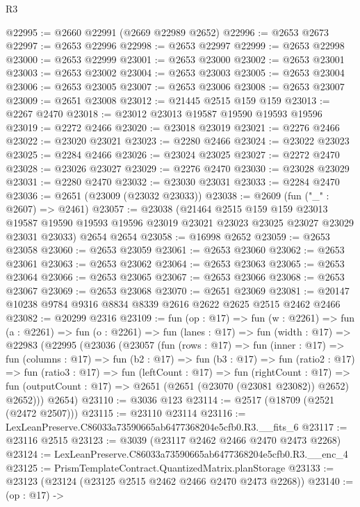 \begin{lexlean}{R3}
\begin{coremodule}
@22995 := @2660 @22991 (@2669 @22989 @2652)
@22996 := @2653 @2673
@22997 := @2653 @22996
@22998 := @2653 @22997
@22999 := @2653 @22998
@23000 := @2653 @22999
@23001 := @2653 @23000
@23002 := @2653 @23001
@23003 := @2653 @23002
@23004 := @2653 @23003
@23005 := @2653 @23004
@23006 := @2653 @23005
@23007 := @2653 @23006
@23008 := @2653 @23007
@23009 := @2651 @23008
@23012 := @21445 @2515 @159 @159
@23013 := @2267 @2470
@23018 := @23012 @23013 @19587 @19590 @19593 @19596
@23019 := @2272 @2466
@23020 := @23018 @23019
@23021 := @2276 @2466
@23022 := @23020 @23021
@23023 := @2280 @2466
@23024 := @23022 @23023
@23025 := @2284 @2466
@23026 := @23024 @23025
@23027 := @2272 @2470
@23028 := @23026 @23027
@23029 := @2276 @2470
@23030 := @23028 @23029
@23031 := @2280 @2470
@23032 := @23030 @23031
@23033 := @2284 @2470
@23036 := @2651 (@23009 (@23032 @23033))
@23038 := @2609 (fun ("_" : @2607) => @2461)
@23057 := @23038
    (@21464
      @2515
      @159
      @159
      @23013
      @19587
      @19590
      @19593
      @19596
      @23019
      @23021
      @23023
      @23025
      @23027
      @23029
      @23031
      @23033)
    @2654
    @2654
@23058 := @16998 @2652
@23059 := @2653 @23058
@23060 := @2653 @23059
@23061 := @2653 @23060
@23062 := @2653 @23061
@23063 := @2653 @23062
@23064 := @2653 @23063
@23065 := @2653 @23064
@23066 := @2653 @23065
@23067 := @2653 @23066
@23068 := @2653 @23067
@23069 := @2653 @23068
@23070 := @2651 @23069
@23081 := @20147 @10238 @9784 @9316 @8834 @8339 @2616 @2622 @2625 @2515 @2462 @2466
@23082 := @20299 @2316
@23109 := fun (op : @17) =>
  fun (w : @2261) =>
  fun (a : @2261) =>
  fun (o : @2261) =>
  fun (lanes : @17) =>
  fun (width : @17) =>
  @22983
    (@22995
      (@23036
        (@23057
          (fun (rows : @17) =>
          fun (inner : @17) =>
          fun (columns : @17) =>
          fun (b2 : @17) =>
          fun (b3 : @17) =>
          fun (ratio2 : @17) =>
          fun (ratio3 : @17) =>
          fun (leftCount : @17) =>
          fun (rightCount : @17) =>
          fun (outputCount : @17) => @2651 (@2651 (@23070 (@23081 @23082)) @2652) @2652)))
      @2654)
@23110 := @3036 @123
@23114 := @2517 (@18709 (@2521 (@2472 @2507)))
@23115 := @23110 @23114
@23116 := LexLeanPreserve.C86033a73590665ab6477368204e5cfb0.R3.__fits_6
@23117 := @23116 @2515
@23123 := @3039 (@23117 @2462 @2466 @2470 @2473 @2268)
@23124 := LexLeanPreserve.C86033a73590665ab6477368204e5cfb0.R3.__enc_4
@23125 := PrismTemplateContract.QuantizedMatrix.planStorage
@23133 := @23123 (@23124 (@23125 @2515 @2462 @2466 @2470 @2473 @2268))
@23140 := (op : @17) ->

\end{coremodule}
\end{lexlean}
